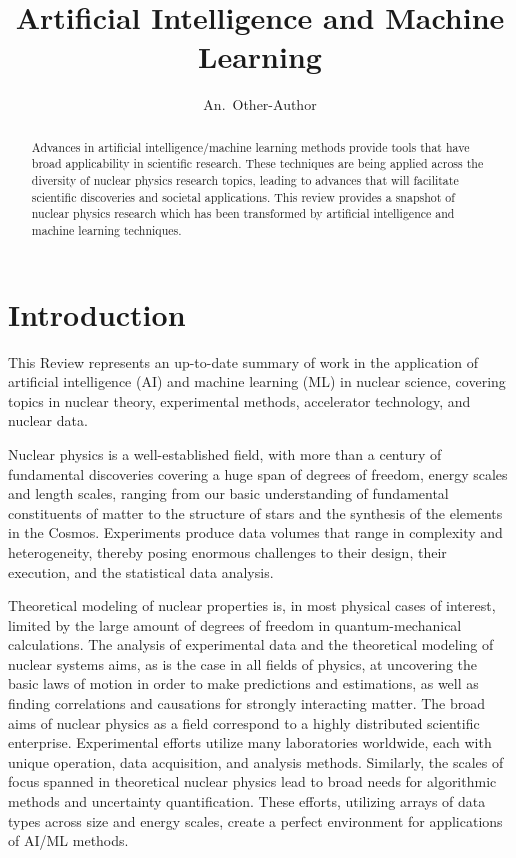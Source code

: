 \documentclass[aps,rmp,reprint,amsmath,amssymb,graphicx,longbibliography]{revtex4-2}
\begin{document}

\title{Artificial Intelligence and Machine Learning}

\author{An.~Other-Author}


\begin{abstract}
    Advances in artificial intelligence/machine learning methods provide tools that have broad applicability in scientific research.  These techniques are being applied across the diversity of nuclear physics research topics, leading to advances that will facilitate scientific discoveries and societal applications. 
    This review provides a snapshot of nuclear physics research  which has been transformed by  artificial intelligence and machine learning techniques. 
\end{abstract}

\maketitle

\tableofcontents


\section{Introduction} 

This Review represents an up-to-date summary of  work in the application of artificial intelligence (AI) and machine learning (ML)
in nuclear science, covering topics in nuclear theory, experimental methods, accelerator technology, and nuclear data.


Nuclear physics is a well-established field, with more than a century of fundamental discoveries covering a huge span of degrees of freedom, energy scales and length scales, ranging from our basic understanding of  fundamental constituents of matter  to the structure of stars and the synthesis of the elements in the Cosmos. Experiments 
produce data volumes that range in complexity and heterogeneity, thereby posing enormous challenges to their 
 design,  their execution, and
the statistical data analysis.
 
 Theoretical modeling of nuclear properties is, in most physical cases
 of interest, limited by the large amount of degrees of freedom in
 quantum-mechanical calculations. The analysis of experimental data
 and the theoretical modeling of nuclear systems aims, as is the case
 in all fields of physics, at uncovering the basic laws of motion in
 order to make predictions and estimations, as well as finding
 correlations and causations for strongly interacting matter. The
 broad aims of nuclear physics as a field correspond to a highly
 distributed scientific enterprise. Experimental efforts utilize many
 laboratories worldwide, each with unique operation, data acquisition,
 and analysis methods. Similarly, the scales of focus spanned in
 theoretical nuclear physics lead to broad needs for algorithmic
 methods and uncertainty quantification. These efforts, utilizing
 arrays of data types across size and energy scales, create a perfect
 environment for applications of AI/ML methods.
\end{document}
